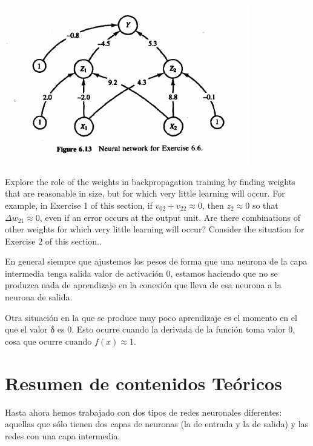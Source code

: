 \begin{problem}[6]
\spart

\end{problem}

\begin{center}
\includegraphics[width=0.8\textwidth]{img/figure6-13.png}
\end{center}

\begin{problem}[7]
Explore the role of the weights in backpropagation training by finding weights that are reasonable in size, but for which very little learning will occur. For example, in Exercise 1 of this section, if $v_{02}+v_{22}\approx 0$, then $z_2 \approx 0$ so that $Δw_{21}\approx 0$, even if an error occurs at the output unit. Are there combinations of other weights for which very little
learning will occur? Consider the situation for Exercise 2 of this section..

\solution

En general siempre que ajustemos los pesos de forma que una neurona de la capa intermedia tenga salida valor de activación 0, estamos haciendo que no se produzca nada de aprendizaje en la conexión que lleva de esa neurona a la neurona de salida.

Otra situación en la que se produce muy poco aprendizaje es el momento en el que el valor δ es 0. Esto ocurre cuando la derivada de la función toma valor 0, cosa que ocurre cuando $f(x)\approx 1$.
\end{problem}

\section{Resumen de contenidos Teóricos}
Hasta ahora hemos trabajado con dos tipos de redes neuronales diferentes: aquellas que sólo tienen dos capas de neuronas (la de entrada y la de salida) y las redes con una capa intermedia.

